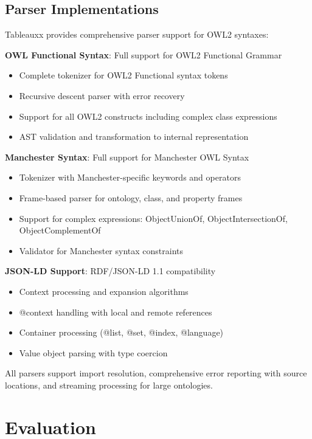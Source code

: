 \documentclass[preprint,12pt]{elsarticle}
\begin{document}
\subsection{Parser Implementations}
\label{sec:parsers}

Tableauxx provides comprehensive parser support for OWL2 syntaxes:

\textbf{OWL Functional Syntax}: Full support for OWL2 Functional Grammar
\begin{itemize}
    \item Complete tokenizer for OWL2 Functional syntax tokens
    \item Recursive descent parser with error recovery
    \item Support for all OWL2 constructs including complex class expressions
    \item AST validation and transformation to internal representation
\end{itemize}

\textbf{Manchester Syntax}: Full support for Manchester OWL Syntax
\begin{itemize}
    \item Tokenizer with Manchester-specific keywords and operators
    \item Frame-based parser for ontology, class, and property frames
    \item Support for complex expressions: ObjectUnionOf, ObjectIntersectionOf, ObjectComplementOf
    \item Validator for Manchester syntax constraints
\end{itemize}

\textbf{JSON-LD Support}: RDF/JSON-LD 1.1 compatibility
\begin{itemize}
    \item Context processing and expansion algorithms
    \item @context handling with local and remote references
    \item Container processing (@list, @set, @index, @language)
    \item Value object parsing with type coercion
\end{itemize}

All parsers support import resolution, comprehensive error reporting with source locations, and streaming processing for large ontologies.

\section{Evaluation}
\label{sec:evaluation}
\end{document}
